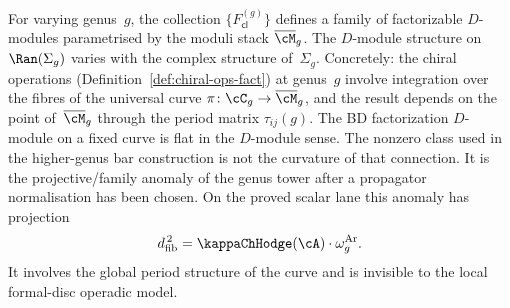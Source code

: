 \begin{remark}
\label{rem:families-over-Mbar}
For varying genus~$g$, the collection $\{F_{\mathsf{cl}}^{(g)}\}$
defines a family of factorizable $D$-modules parametrised by the
moduli stack $\Mbar_g$. The $D$-module structure on
$\Ran(\Sigma_g)$ varies with the complex structure of~$\Sigma_g$.
Concretely: the chiral operations
(Definition~\ref{def:chiral-ops-fact}) at genus~$g$ involve
integration over the fibres of the universal curve
$\pi\colon \cC_g \to \Mbar_g$, and the result depends on the
point of~$\Mbar_g$ through the period matrix $\tau_{ij}(g)$.
The BD factorization $D$-module on a fixed curve is flat in the
$D$-module sense. The nonzero class used in the higher-genus bar
construction is not the curvature of that connection. It is the
projective/family anomaly of the genus tower after a propagator
normalisation has been chosen. On the proved scalar lane this
anomaly has projection
\[
\dfib^{\,2}=\kappaChHodge(\cA)\cdot\omega_g^{\mathrm{Ar}} .
\]
It involves the global period structure of the curve and is
invisible to the local formal-disc operadic model.
\end{remark}

